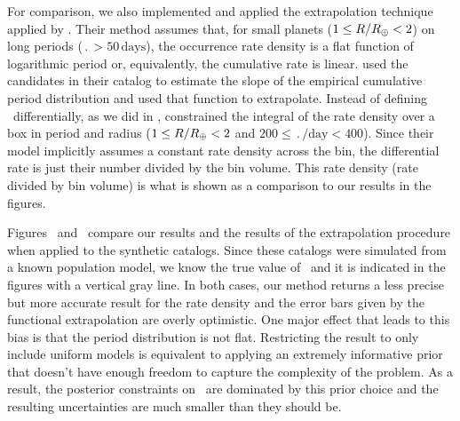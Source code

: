For comparison, we also implemented and applied the extrapolation technique
applied by \citet{Petigura:2013}.
Their method assumes that, for small planets ($1 \le R/R_\oplus <
2$) on long periods ($\period > 50\,\mathrm{days}$), the occurrence rate
density is a flat function of logarithmic period or, equivalently, the
cumulative rate is linear.
\citet{Petigura:2013} used the candidates in their catalog to estimate the slope of
the empirical cumulative period distribution and used that function to
extrapolate.
Instead of defining \gammaearth\ differentially, as we did in ,
\citet{Petigura:2013} constrained the integral of the rate density over a box in
period and radius ($1 \le R/R_\oplus < 2$ and $200 \le
\period/\mathrm{day} < 400$).
Since their model implicitly assumes a constant rate density across the bin,
the differential rate is just their number divided by the bin volume.
This rate density (rate divided by bin volume) is what is shown as a
comparison to our results in the figures.

Figures~ and~ compare our results
and the results of the \citet{Petigura:2013} extrapolation procedure when applied
to the synthetic catalogs.
Since these catalogs were simulated from a known population model, we know the
true value of \gammaearth\ and it is indicated in the figures with a vertical
gray line.
In both cases, our method returns a less precise but more accurate result for
the rate density and the error bars given by the functional extrapolation
are overly optimistic.
One major effect that leads to this bias is that the period distribution is
not flat.
Restricting the result to only include uniform models is equivalent to
applying an extremely informative prior that doesn't have enough freedom to
capture the complexity of the problem.
As a result, the posterior constraints on \gammaearth\ are dominated by this
prior choice and the resulting uncertainties are much smaller than they should
be.

